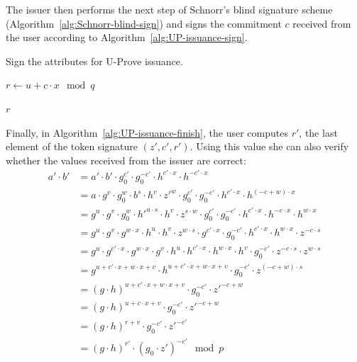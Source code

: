 The issuer then performs the next step of Schnorr's blind signature scheme
(Algorithm~\ref{alg:Schnorr-blind-sign}) and signs the commitment $c$ received
from the user according to Algorithm~\ref{alg:UP-issuance-sign}.

\begin{algorithm}
  \caption{Sign the attributes for U-Prove issuance.}
  \label{alg:UP-issuance-sign}
  \addtolength{\baselineskip}{1mm}
  \begin{algorithmic}[1]
      \State $r \gets u + c \cdot x \mod q$

      \Return $r$
    \EndFunction
  \end{algorithmic}
\end{algorithm}

Finally, in Algorithm~\ref{alg:UP-issuance-finish}, the user computes $r'$, the
last element of the token signature $(z', c', r')$. Using this value she can
also verify whether the values received from the issuer are correct:
\begin{align*}
  a' \cdot b'
  & = a' \cdot b' \cdot g_0^{c'} \cdot g_0^{-c'} \cdot h^{c' \cdot x} \cdot h^{-c' \cdot x} \\
  & = a \cdot g^v \cdot g_0^w \cdot b^s \cdot h^v \cdot z'^w
    \cdot g_0^{c'} \cdot g_0^{-c'} \cdot h^{c' \cdot x} \cdot h^{(-c + w) \cdot x} \\
  & = g^u \cdot g^v \cdot g_0^w \cdot h'^{u \cdot s} \cdot h^v \cdot z^{s \cdot w}
    \cdot g_0^{c'} \cdot g_0^{-c'} \cdot h^{c' \cdot x} \cdot h^{-c \cdot x} \cdot h^{w \cdot x} \\
  & = g^u \cdot g^v \cdot g^{w \cdot x} \cdot h^u \cdot h^v \cdot z^{w \cdot s}
    \cdot g^{c' \cdot x} \cdot g_0^{-c'}  \cdot h^{c' \cdot x} \cdot h^{w \cdot x} \cdot z^{-c \cdot s} \\
  & = g^u \cdot g^{c' \cdot x} \cdot g^{w \cdot x} \cdot g^v \cdot h^u
    \cdot h^{c' \cdot x} \cdot h^{w \cdot x} \cdot h^v \cdot g_0^{-c'} \cdot z^{-c \cdot s} \cdot z^{w \cdot s} \\
  & = g^{u + c' \cdot x + w \cdot x + v} \cdot h^{u + c' \cdot x + w \cdot x + v}
    \cdot g_0^{-c'} \cdot z^{(-c + w) \cdot s} \\
  & = (g \cdot h)^{u + c' \cdot x + w \cdot x + v} \cdot g_0^{-c'} \cdot z'^{-c + w} \\
  & = (g \cdot h)^{u + c \cdot x + v} \cdot g_0^{-c'} \cdot z'^{-c + w} \\
  & = (g \cdot h)^{r + v} \cdot g_0^{-c'} \cdot z'^{-c'} \\
  & = (g \cdot h)^{r'} \cdot (g_0 \cdot z')^{-c'} \mod p
\end{align*}

